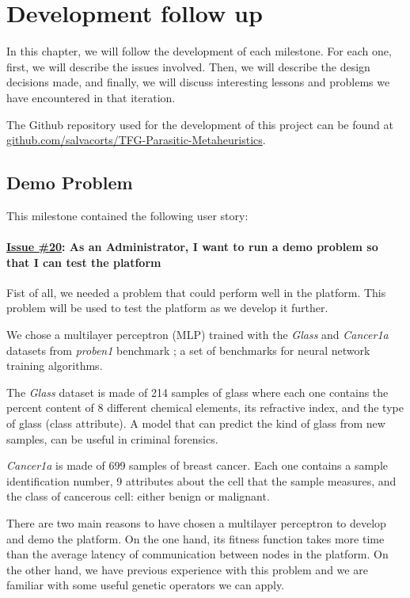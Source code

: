 \chapter{Development follow up}
In this chapter, we will follow the development of each milestone. For each one, first, we will describe the issues involved. Then, we will describe the design decisions made, and finally, we will discuss interesting lessons and problems we have encountered in that iteration.

The Github repository used for the development of this project can be found at \href{https://github.com/salvacorts/TFG-Parasitic-Metaheuristics}{github.com/salvacorts/TFG-Parasitic-Metaheuristics}.

\section{Demo Problem}
This milestone contained the following user story:

\subsubsection*{\href{https://github.com/salvacorts/TFG-Parasitic-Metaheuristics/issues/20}{Issue \#20}: As an Administrator, I want to run a demo problem so that I can test the platform} 

Fist of all, we needed a problem that could perform well in the platform. This problem will be used to test the platform as we develop it further.

We chose a multilayer perceptron (MLP) trained with the \textit{Glass} and \textit{Cancer1a} datasets from \textit{proben1} benchmark \cite{proben1}; a set of benchmarks for neural network training algorithms.

The \textit{Glass} dataset is made of 214 samples of glass where each one contains the percent content of 8 different chemical elements, its refractive index, and the type of glass (class attribute). A model that can predict the kind of glass from new samples, can be useful in criminal forensics.

\textit{Cancer1a} is made of 699 samples of breast cancer. Each one contains a sample identification number, 9 attributes about the cell that the sample measures, and the class of cancerous cell: either benign or malignant.

There are two main reasons to have chosen a multilayer perceptron to develop and demo the platform. On the one hand, its fitness function takes more time than the average latency of communication between nodes in the platform. On the other hand, we have previous experience \cite{gprop} with this problem and we are familiar with some useful genetic operators we can apply.


